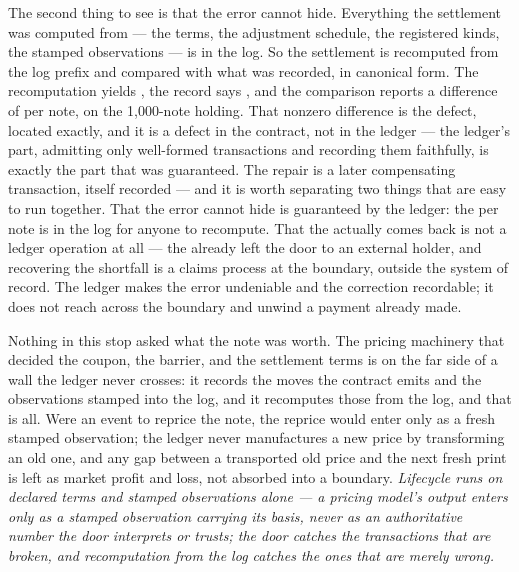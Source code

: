 The second thing to see is that the error cannot hide. Everything the settlement was
computed from --- the terms, the adjustment schedule, the registered kinds, the stamped
observations --- is in the log. So the settlement is recomputed from the log prefix and
compared with what was recorded, in canonical form. The recomputation yields ,
the record says , and the comparison reports a difference of  per note,
 on the 1{,}000-note holding. That nonzero difference is the defect,
located exactly, and it is a defect in the contract, not in the ledger --- the ledger's
part, admitting only well-formed transactions and recording them faithfully, is exactly
the part that was guaranteed. The repair is a later compensating transaction, itself
recorded --- and it is worth separating two things that are easy to run together. That
the error cannot hide is guaranteed by the ledger: the  per note is in the log
for anyone to recompute. That the  actually comes back is not a ledger
operation at all --- the  already left the door to an external holder, and
recovering the shortfall is a claims process at the boundary, outside the system of
record. The ledger makes the error undeniable and the correction recordable; it does
not reach across the boundary and unwind a payment already made.

Nothing in this stop asked what the note was worth. The pricing machinery that decided
the coupon, the barrier, and the settlement terms is on the far side of a wall the
ledger never crosses: it records the moves the contract emits and the observations
stamped into the log, and it recomputes those from the log, and that is all. Were an
event to reprice the note, the reprice would enter only as a fresh stamped observation;
the ledger never manufactures a new price by transforming an old one, and any gap
between a transported old price and the next fresh print is left as market profit and
loss, not absorbed into a boundary. \emph{Lifecycle runs on declared terms and stamped
observations alone --- a pricing model's output enters only as a stamped
observation carrying its basis, never as an authoritative number the door interprets or
trusts; the door catches the transactions that are broken, and recomputation from the
log catches the ones that are merely wrong.}
